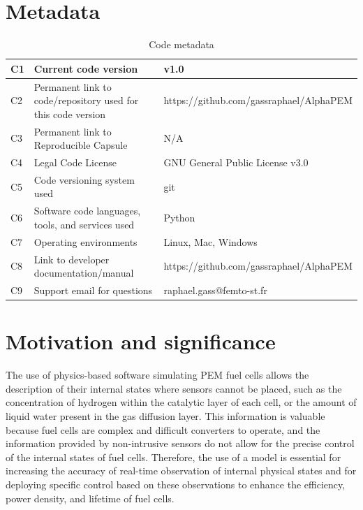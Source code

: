 \documentclass[postprint,3p,times]{elsarticle}
\begin{document}
\section*{Metadata}

\begin{table}[!h]
\begin{tabular}{|l|p{6.5cm}|p{6.5cm}|}
\hline
C1 & Current code version & v1.0 \\
\hline
C2 & Permanent link to code/repository used for this code version & https://github.com/gassraphael/AlphaPEM \\
\hline
C3  & Permanent link to Reproducible Capsule & N/A \\
\hline
C4 & Legal Code License & GNU General Public License v3.0 \\
\hline
C5 & Code versioning system used & git \\
\hline
C6 & Software code languages, tools, and services used & Python \\
\hline
C7 & Operating environments & Linux, Mac, Windows \\
\hline
C8 & Link to developer documentation/manual & https://github.com/gassraphael/AlphaPEM \\
\hline
C9 & Support email for questions & raphael.gass@femto-st.fr \\
\hline
\end{tabular}
\caption{Code metadata}
\label{codeMetadata} 
\end{table}


\section{Motivation and significance}

The use of physics-based software simulating PEM fuel cells allows the description of their internal states where sensors cannot be placed, such as the concentration of hydrogen within the catalytic layer of each cell, or the amount of liquid water present in the gas diffusion layer. This information is valuable because fuel cells are complex and difficult converters to operate, and the information provided by non-intrusive sensors do not allow for the precise control of the internal states of fuel cells. Therefore, the use of a model is essential for increasing the accuracy of real-time observation of internal physical states and for deploying specific control based on these observations to enhance the efficiency, power density, and lifetime of fuel cells.  
    
\end{document}
